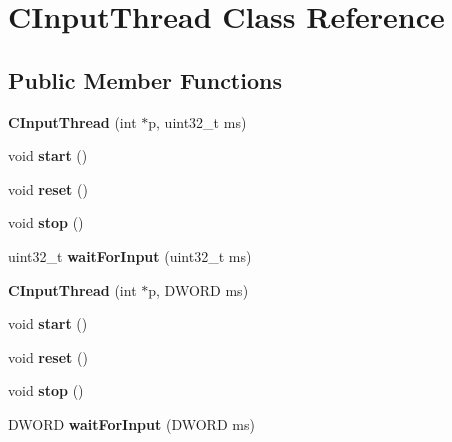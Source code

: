 \hypertarget{class_c_input_thread}{
\section{CInputThread Class Reference}
\label{class_c_input_thread}
}
\subsection*{Public Member Functions}
\begin{DoxyCompactItemize}
\item 
\hypertarget{class_c_input_thread_a46973d13b00057ec0216d02c4760c120}{
{\bfseries CInputThread} (int $\ast$p, uint32\_\-t ms)}
\label{class_c_input_thread_a46973d13b00057ec0216d02c4760c120}

\item 
\hypertarget{class_c_input_thread_ad0f5c0ebf0c02533b0fc70a6f5b07821}{
void {\bfseries start} ()}
\label{class_c_input_thread_ad0f5c0ebf0c02533b0fc70a6f5b07821}

\item 
\hypertarget{class_c_input_thread_afc3a2103f40fadc1bb3c48cf37e46473}{
void {\bfseries reset} ()}
\label{class_c_input_thread_afc3a2103f40fadc1bb3c48cf37e46473}

\item 
\hypertarget{class_c_input_thread_a2e58afc0aa105ddc76bc375d4037d2c7}{
void {\bfseries stop} ()}
\label{class_c_input_thread_a2e58afc0aa105ddc76bc375d4037d2c7}

\item 
\hypertarget{class_c_input_thread_a37d583b0434635b8eb1a4efac75db1dc}{
uint32\_\-t {\bfseries waitForInput} (uint32\_\-t ms)}
\label{class_c_input_thread_a37d583b0434635b8eb1a4efac75db1dc}

\item 
\hypertarget{class_c_input_thread_aaad4023c8a98d90c389537fa1b8d77f4}{
{\bfseries CInputThread} (int $\ast$p, DWORD ms)}
\label{class_c_input_thread_aaad4023c8a98d90c389537fa1b8d77f4}

\item 
\hypertarget{class_c_input_thread_ad0f5c0ebf0c02533b0fc70a6f5b07821}{
void {\bfseries start} ()}
\label{class_c_input_thread_ad0f5c0ebf0c02533b0fc70a6f5b07821}

\item 
\hypertarget{class_c_input_thread_afc3a2103f40fadc1bb3c48cf37e46473}{
void {\bfseries reset} ()}
\label{class_c_input_thread_afc3a2103f40fadc1bb3c48cf37e46473}

\item 
\hypertarget{class_c_input_thread_a2e58afc0aa105ddc76bc375d4037d2c7}{
void {\bfseries stop} ()}
\label{class_c_input_thread_a2e58afc0aa105ddc76bc375d4037d2c7}

\item 
\hypertarget{class_c_input_thread_ae4ba5c7964e36b54930e588b308ae097}{
DWORD {\bfseries waitForInput} (DWORD ms)}
\label{class_c_input_thread_ae4ba5c7964e36b54930e588b308ae097}

\end{DoxyCompactItemize}
